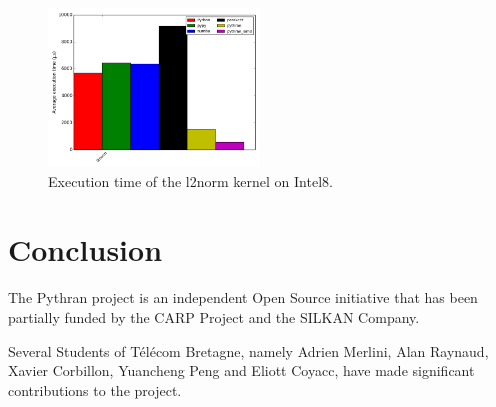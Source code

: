 \documentclass[10pt, preprint]{sigplanconf}
\begin{document}
\begin{figure}[t]
\centering
\includegraphics[width=0.5\textwidth]{l2norm_intel8.png}
\caption{Execution time of the l2norm kernel on Intel8.}
\label{fig:l2norm_intel8}
\end{figure}


\section*{Conclusion}

\acks

The Pythran project is an independent Open Source initiative that has been
partially funded by the CARP Project and the SILKAN Company.

Several Students of Télécom Bretagne, namely Adrien Merlini, Alan Raynaud,
Xavier Corbillon, Yuancheng Peng and Eliott Coyacc, have made significant
contributions to the project.




\end{document}
